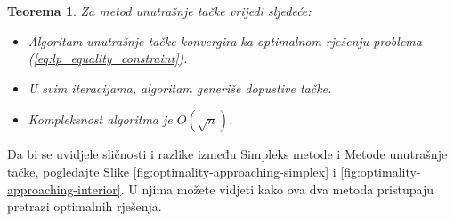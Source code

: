 \documentclass[a4paper, utf8, 11pt, colorlinks]{book}
\newtheorem{thm}{Teorema}[chapter]
\theoremstyle{definition}
\begin{document}
\begin{thm} Za metod unutrašnje tačke vrijedi sljedeće:
	\begin{itemize}
		\item Algoritam unutrašnje tačke konvergira ka optimalnom rješenju problema (\ref{eq:lp_equality_constraint}). %
		\item U svim iteracijama, algoritam generiše dopustive tačke.
		\item Kompleksnost algoritma je $O(\sqrt{n})$. %
	\end{itemize}
\end{thm}

Da bi se uvidjele sličnosti i razlike između Simpleks metode i Metode unutrašnje tačke, pogledajte Slike \ref{fig:optimality-approaching-simplex} i  \ref{fig:optimality-approaching-interior}. U njima možete vidjeti kako ova dva metoda pristupaju pretrazi optimalnih rješenja. 
\end{document}
